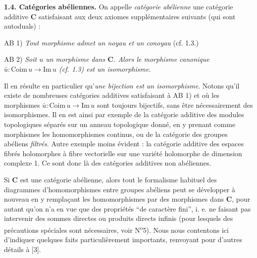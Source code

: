 
\noindent\textbf{1.4. Catégories abéliennes.}
On appelle \textit{catégorie abélienne} une catégorie additive $\mathbf{C}$
satisfaisant aux deux axiomes supplémentaires suivants (qui sont autoduals) :

\noindent AB 1) \textit{Tout morphisme admet un noyau et un conoyau}
(cf. 1.3.)

\noindent AB 2) \textit{Soit $u$ un morphisme dans $\mathbf{C}$. Alors le
morphisme canonique
$\bar u:\mathrm{Coim}\,u\to\mathrm{Im}\,u$ \textup{(cf. 1.3)} est un
isomorphisme.}

Il en résulte en particulier qu'\textit{une bijection est un isomorphisme}.
Notons qu'il existe de nombreuses catégories additives satisfaisant à AB 1) et
où les morphismes $\bar u:\mathrm{Coim}\,u\to\mathrm{Im}\,u$ sont
toujours bijectifs, sans être nécessairement des isomorphismes. Il en est ainsi
par exemple de la catégorie additive des modules topologiques séparés sur un
anneau topologique donné, en y prenant comme morphismes les homomorphismes
continus, ou de la catégorie des groupes abéliens \textit{filtrés}. Autre
exemple moins évident : la catégorie additive des espaces fibrés holomorphes à
fibre vectorielle sur une variété holomorphe de dimension complexe 1. Ce sont
donc là des catégories additives non abéliennes.

Si $\mathbf{C}$ est une catégorie abélienne, alors tout le formalisme habituel des
diagrammes d'homomorphismes entre groupes abéliens peut se développer à
nouveau en y remplaçant les homomorphismes par des morphismes dans $\mathbf{C}$, pour
autant qu'on n'a en vue que des propriétés ``de caractère fini'', i. e. ne
faisant pas intervenir des sommes directes ou produits directs infinis (pour
lesquels des précautions spéciales sont nécessaires, voir
N\textsuperscript{o}5). Nous nous contentons ici d'indiquer quelques faits
particulièrement importants, renvoyant pour d'autres détails à [3].

